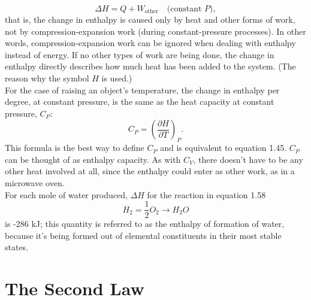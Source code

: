 \documentclass[11pt]{exam}
\begin{document}
\begin{equation}\tag{1.55}
\Delta H = Q +  W_{\text{other}}\quad\text{(constant $P$)}, 
\end{equation}
that is, the change in enthalpy is caused only by heat and other forms of work, not by compression-expansion work (during constant-pressure processes). In other words, compression-expansion work can be ignored when dealing with enthalpy instead of energy. If no other types of work are being done, the change in enthalpy directly describes how much heat has been added to the system. (The reason why the symbol $H$ is used.)\\
\hspace*{10mm}For the case of raising an object's temperature, the change in enthalpy per degree, at constant pressure, is the same as the heat capacity at constant pressure, $C_P$: 
\begin{equation}\tag{1.56}
C_P = \left(\frac{\partial H}{\partial T}\right)_P.     
\end{equation}
This formula is the best way to define $C_P$ and is equivalent to equation 1.45. $C_P$ can be thought of as enthalpy capacity. As with $C_V$, there doesn't have to be any other heat involved at all, since the enthalpy could enter as other work, as in a microwave oven. \\
\hspace*{10mm}For each mole of water produced, $\Delta H$ for the reaction in equation 1.58 
\begin{equation}\tag{1.58}
H_2 = \frac{1}{2}O_2 \rightarrow H_2O    
\end{equation}
is -286 kJ; this quantity is referred to as the enthalpy of formation of water, because it's being formed out of elemental constituents in their most stable states. 
\newpage
\section{The Second Law}
\end{document}
